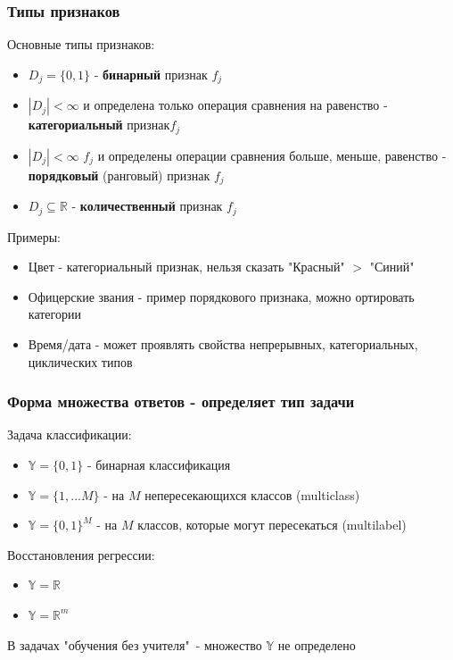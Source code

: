\documentclass{beamer}
\begin{document}
	
	\begin{frame}
		\frametitle{Типы признаков}
		Основные типы признаков:
		\begin{itemize}
			\item $D_j = \{0, 1\}$ - \textbf{бинарный} признак $f_j$
			\item $|D_j| < \infty$ и определена только операция сравнения на равенство - \textbf{категориальный} признак$f_j$
			\item $|D_j| < \infty$ $f_j$ и определены операции сравнения больше, меньше, равенство - \textbf{порядковый }(ранговый) признак $f_j$
			\item $D_j \subseteq \mathbb{R}$ - \textbf{количественный} признак $f_j$
		\end{itemize}
	
		\vspace{5pt}
		
		Примеры:
		\begin{itemize}
			\item Цвет - категориальный признак, нельзя сказать "Красный" $>$ "Синий"
			\item Офицерские звания - пример порядкового признака, можно ортировать категории
			\item Время/дата - может проявлять свойства непрерывных, категориальных, циклических типов
		\end{itemize}
	\end{frame}
	
	
	\begin{frame}
		\frametitle{Форма множества ответов - определяет тип задачи}
		
		Задача классификации:
		\begin{itemize}
			\item $\mathbb{Y} = \{0, 1\}$ - бинарная классификация
			\item $\mathbb{Y} = \{1, ... M\}$ - на $M$ непересекающихся классов (multiclass)
			\item $\mathbb{Y} = \{0, 1\}^{M}$ - на $M$ классов, которые могут пересекаться (multilabel)
		\end{itemize}
		
		\vspace{5pt}
		
		Восстановления регрессии:
		\begin{itemize}
			\item $\mathbb{Y} = \mathbb{R}$ 
			\item $\mathbb{Y} = \mathbb{R}^{m}$
		\end{itemize}
	
		\vspace{5pt}
		
		В задачах "обучения без учителя"\ - множество $\mathbb{Y}$ не определено
	\end{frame}
\end{document}
